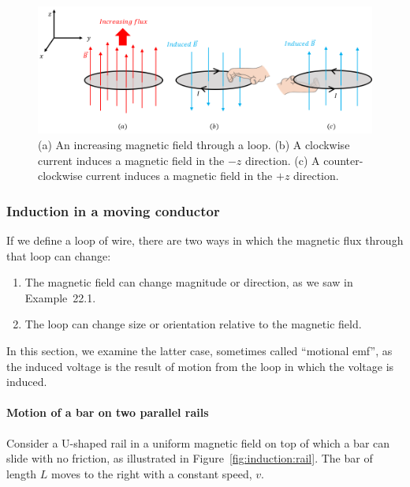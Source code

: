 \begin{framed}
\begin{figure}[!htbp]
\centering
\includegraphics[width=0.9\linewidth]{files/lenzs_example-d7f248103d55bc911f37a92a8fc83217.png}
\caption[]{(a) An increasing magnetic field through a loop. (b) A clockwise current induces a magnetic field in the $-z$ direction. (c) A counter-clockwise current induces a magnetic field in the $+z$ direction.}
\label{fig:induction:lenzs_example}
\end{figure}
\end{framed}

\subsubsection{Induction in a moving conductor}

If we define a loop of wire, there are two ways in which the magnetic flux through that loop can change:

\begin{enumerate}
\item The magnetic field can change magnitude or direction, as we saw in Example~22.1.
\item The loop can change size or orientation relative to the magnetic field.
\end{enumerate}

In this section, we examine the latter case, sometimes called ``motional emf'', as the induced voltage is the result of motion from the loop in which the voltage is induced.

\paragraph{Motion of a bar on two parallel rails}

Consider a U-shaped rail in a uniform magnetic field on top of which a bar can slide with no friction, as illustrated in Figure~\ref{fig:induction:rail}. The bar of length $L$ moves to the right with a constant speed, $v$.

